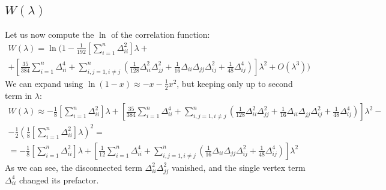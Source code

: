 \documentclass{article}
\begin{document}
\subsection{$W(\lambda)$}
Let us now compute the $\ln$ of the correlation function:
\begin{equation}
\begin{gathered}
    W(\lambda) = \ln\Bigg(1 - \frac{1}{192} \left[\sum_{i=1}^n \Delta_{ii}^2\right] \lambda + \\ + \left[\frac{35}{384}\sum_{i=1}^n \Delta_{ii}^4 + \sum_{i,j=1, i\ne j}^n \left(\frac{1}{128} \Delta_{ii}^2 \Delta_{jj}^2 + \frac{1}{16}\Delta_{ii}\Delta_{jj}\Delta_{ij}^2 + \frac{1}{48}\Delta_{ij}^4\right)\right]\lambda^2 + O(\lambda^3) \Bigg)
\end{gathered}
\end{equation}
We can expand using $\ln(1 - x) \approx - x - \frac{1}{2}x^2$, but keeping only up to second term in $\lambda$:
\begin{equation}
\begin{gathered}
    W(\lambda) \approx - \frac{1}{8} \left[\sum_{i=1}^n \Delta_{ii}^2\right] \lambda + \left[\frac{35}{384}\sum_{i=1}^n \Delta_{ii}^4 + \sum_{i,j=1, i\ne j}^n \left(\frac{1}{128} \Delta_{ii}^2 \Delta_{jj}^2 + \frac{1}{16}\Delta_{ii}\Delta_{jj}\Delta_{ij}^2 + \frac{1}{48}\Delta_{ij}^4\right)\right]\lambda^2 - \\ -
    \frac{1}{2}\left(\frac{1}{8}\left[\sum_{i=1}^n \Delta_{ii}^2\right] \lambda\right)^2 = \\ =
    - \frac{1}{8} \left[\sum_{i=1}^n \Delta_{ii}^2\right] \lambda + \left[\frac{1}{12}\sum_{i=1}^n \Delta_{ii}^4 + \sum_{i,j=1, i\ne j}^n \left(\frac{1}{16}\Delta_{ii}\Delta_{jj}\Delta_{ij}^2 + \frac{1}{48}\Delta_{ij}^4\right)\right]\lambda^2
\end{gathered}
\end{equation}
As we can see, the disconnected term $\Delta_{ii}^2\Delta_{jj}^2$ vanished, and the single vertex term $\Delta_{ii}^4$ changed its prefactor.

\newpage
\end{document}
